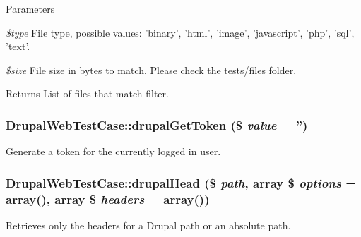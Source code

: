 \begin{DoxyParams}{Parameters}
\item[{\em \$type}]File type, possible values: 'binary', 'html', 'image', 'javascript', 'php', 'sql', 'text'. \item[{\em \$size}]File size in bytes to match. Please check the tests/files folder. \end{DoxyParams}
\begin{DoxyReturn}{Returns}
List of files that match filter. 
\end{DoxyReturn}
\hypertarget{class_drupal_web_test_case_a737d7788ee07da4f0184b6d489694070}{
\subsubsection[{drupalGetToken}]{\setlength{\rightskip}{0pt plus 5cm}DrupalWebTestCase::drupalGetToken (\$ {\em value} = {\ttfamily ''})}}
\label{class_drupal_web_test_case_a737d7788ee07da4f0184b6d489694070}
Generate a token for the currently logged in user. \hypertarget{class_drupal_web_test_case_adfed12ec9ae7e71a0de659894d5b171d}{
\subsubsection[{drupalHead}]{\setlength{\rightskip}{0pt plus 5cm}DrupalWebTestCase::drupalHead (\$ {\em path}, \/  array \$ {\em options} = {\ttfamily array()}, \/  array \$ {\em headers} = {\ttfamily array()})}}
\label{class_drupal_web_test_case_adfed12ec9ae7e71a0de659894d5b171d}
Retrieves only the headers for a Drupal path or an absolute path.


